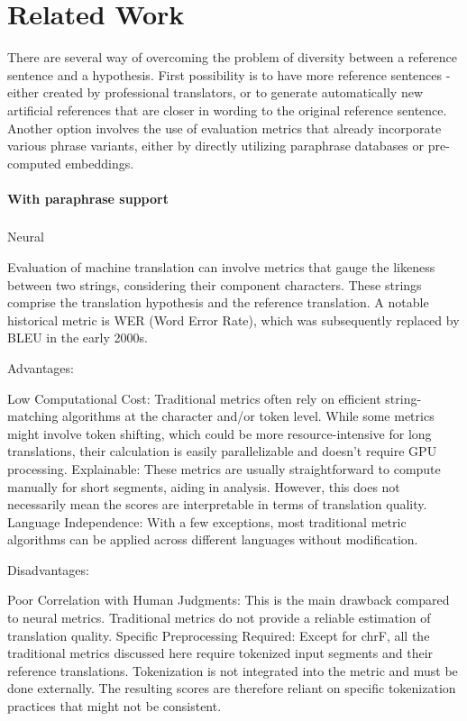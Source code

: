 \chapter{Related Work}
There are several way of overcoming the problem of diversity between a reference sentence and a hypothesis. 
First possibility is to have more reference sentences - either created by professional translators, or to generate automatically new artificial references that are closer in wording to the original reference sentence. Another option involves the use of evaluation metrics that already incorporate various phrase variants, either by directly utilizing paraphrase databases or pre-computed embeddings.




\subsubsection{With paraphrase support}


\subsection{}{Neural}


Evaluation of machine translation can involve metrics that gauge the likeness between two strings, considering their component characters. These strings comprise the translation hypothesis and the reference translation. A notable historical metric is WER (Word Error Rate), which was subsequently replaced by BLEU in the early 2000s.


Advantages:

    Low Computational Cost: Traditional metrics often rely on efficient string-matching algorithms at the character and/or token level. While some metrics might involve token shifting, which could be more resource-intensive for long translations, their calculation is easily parallelizable and doesn't require GPU processing.
    Explainable: These metrics are usually straightforward to compute manually for short segments, aiding in analysis. However, this does not necessarily mean the scores are interpretable in terms of translation quality.
    Language Independence: With a few exceptions, most traditional metric algorithms can be applied across different languages without modification.

Disadvantages:

    Poor Correlation with Human Judgments: This is the main drawback compared to neural metrics. Traditional metrics do not provide a reliable estimation of translation quality.
    Specific Preprocessing Required: Except for chrF, all the traditional metrics discussed here require tokenized input segments and their reference translations. Tokenization is not integrated into the metric and must be done externally. The resulting scores are therefore reliant on specific tokenization practices that might not be consistent.

